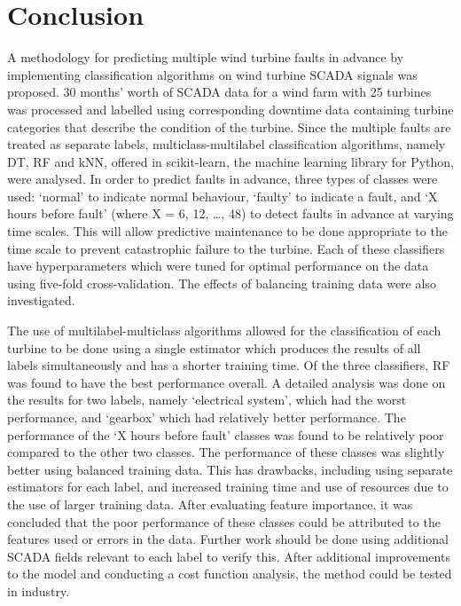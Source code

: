 
\chapter{Conclusion}\label{c5}

A methodology for predicting multiple wind turbine faults in advance by implementing classification algorithms on wind turbine SCADA signals was proposed. 30 months' worth of SCADA data for a wind farm with 25 turbines was processed and labelled using corresponding downtime data containing turbine categories that describe the condition of the turbine. Since the multiple faults are treated as separate labels, multiclass-multilabel classification algorithms, namely DT, RF and kNN, offered in scikit-learn, the machine learning library for Python, were analysed. In order to predict faults in advance, three types of classes were used: `normal' to indicate normal behaviour, `faulty' to indicate a fault, and `X hours before fault' (where X = 6, 12, \dots, 48) to detect faults in advance at varying time scales. This will allow predictive maintenance to be done appropriate to the time scale to prevent catastrophic failure to the turbine. Each of these classifiers have hyperparameters which were tuned for optimal performance on the data using five-fold cross-validation. The effects of balancing training data were also investigated.

The use of multilabel-multiclass algorithms allowed for the classification of each turbine to be done using a single estimator which produces the results of all labels simultaneously and has a shorter training time. Of the three classifiers, RF was found to have the best performance overall. A detailed analysis was done on the results for two labels, namely `electrical system', which had the worst performance, and `gearbox' which had relatively better performance. The performance of the `X hours before fault' classes was found to be relatively poor compared to the other two classes. The performance of these classes was slightly better using balanced training data. This has drawbacks, including using separate estimators for each label, and increased training time and use of resources due to the use of larger training data. After evaluating feature importance, it was concluded that the poor performance of these classes could be attributed to the features used or errors in the data. Further work should be done using additional SCADA fields relevant to each label to verify this. After additional improvements to the model and conducting a cost function analysis, the method could be tested in industry.
